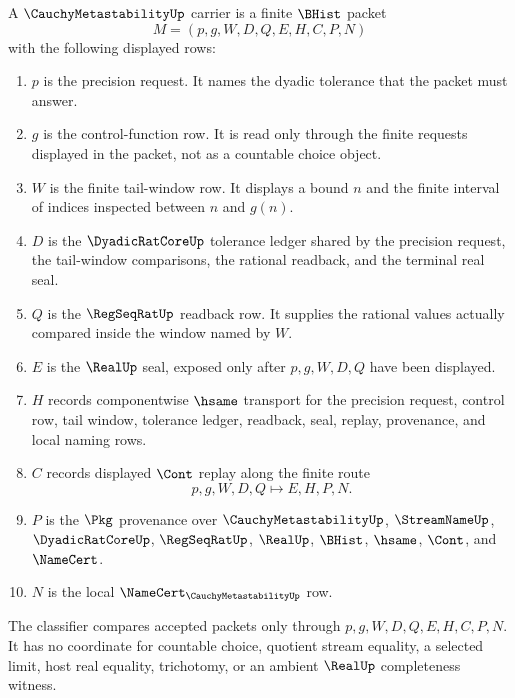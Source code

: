 \begin{definition}\label{def:cauchy-metastability-carrier}
A $\CauchyMetastabilityUp$ carrier is a finite $\BHist$ packet
$$
M=(p,g,W,D,Q,E,H,C,P,N)
$$
with the following displayed rows:
\begin{enumerate}
\item $p$ is the precision request. It names the dyadic tolerance that the packet must answer.
\item $g$ is the control-function row. It is read only through the finite requests displayed in the packet, not as a countable choice object.
\item $W$ is the finite tail-window row. It displays a bound $n$ and the finite interval of indices inspected between $n$ and $g(n)$.
\item $D$ is the $\DyadicRatCoreUp$ tolerance ledger shared by the precision request, the tail-window comparisons, the rational readback, and the terminal real seal.
\item $Q$ is the $\RegSeqRatUp$ readback row. It supplies the rational values actually compared inside the window named by $W$.
\item $E$ is the $\RealUp$ seal, exposed only after $p,g,W,D,Q$ have been displayed.
\item $H$ records componentwise $\hsame$ transport for the precision request, control row, tail window, tolerance ledger, readback, seal, replay, provenance, and local naming rows.
\item $C$ records displayed $\Cont$ replay along the finite route
$$
p,g,W,D,Q \longmapsto E,H,P,N .
$$
\item $P$ is the $\Pkg$ provenance over $\CauchyMetastabilityUp$, $\StreamNameUp$, $\DyadicRatCoreUp$, $\RegSeqRatUp$, $\RealUp$, $\BHist$, $\hsame$, $\Cont$, and $\NameCert$.
\item $N$ is the local $\NameCert_{\CauchyMetastabilityUp}$ row.
\end{enumerate}
The classifier compares accepted packets only through $p,g,W,D,Q,E,H,C,P,N$. It has no coordinate for countable choice, quotient stream equality, a selected limit, host real equality, trichotomy, or an ambient $\RealUp$ completeness witness.
\end{definition}

